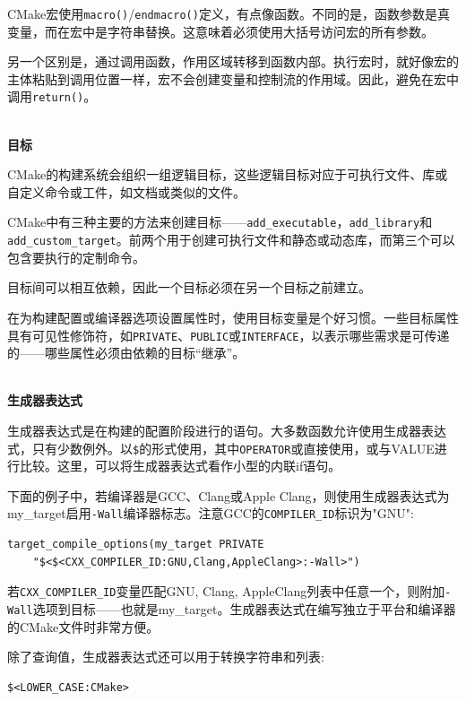 CMake宏使用\texttt{macro()}/\texttt{endmacro()}定义，有点像函数。不同的是，函数参数是真变量，而在宏中是字符串替换。这意味着必须使用大括号访问宏的所有参数。

另一个区别是，通过调用函数，作用区域转移到函数内部。执行宏时，就好像宏的主体粘贴到调用位置一样，宏不会创建变量和控制流的作用域。因此，避免在宏中调用\texttt{return()}。

\hspace*{\fill} \\ %
\noindent
\textbf{目标}

CMake的构建系统会组织一组逻辑目标，这些逻辑目标对应于可执行文件、库或自定义命令或工件，如文档或类似的文件。

CMake中有三种主要的方法来创建目标——\texttt{add\_executable}，\texttt{add\_library}和\texttt{add\_custom\_target}。前两个用于创建可执行文件和静态或动态库，而第三个可以包含要执行的定制命令。

目标间可以相互依赖，因此一个目标必须在另一个目标之前建立。

在为构建配置或编译器选项设置属性时，使用目标变量是个好习惯。一些目标属性具有可见性修饰符，如\texttt{PRIVATE}、\texttt{PUBLIC}或\texttt{INTERFACE}，以表示哪些需求是可传递的——哪些属性必须由依赖的目标“继承”。


\hspace*{\fill} \\ %
\noindent
\textbf{生成器表达式}

生成器表达式是在构建的配置阶段进行的语句。大多数函数允许使用生成器表达式，只有少数例外。以\texttt{\$<OPERATOR:VALUE>}的形式使用，其中\texttt{OPERATOR}或直接使用，或与VALUE进行比较。这里，可以将生成器表达式看作小型的内联if语句。

下面的例子中，若编译器是GCC、Clang或Apple Clang，则使用生成器表达式为my\_target启用\texttt{-Wall}编译器标志。注意GCC的\texttt{COMPILER\_ID}标识为"GNU":

\begin{lstlisting}[style=styleCMake]
target_compile_options(my_target PRIVATE
	"$<$<CXX_COMPILER_ID:GNU,Clang,AppleClang>:-Wall>")
\end{lstlisting}

若\texttt{CXX\_COMPILER\_ID}变量匹配GNU, Clang, AppleClang列表中任意一个，则附加\texttt{-Wall}选项到目标——也就是my\_target。生成器表达式在编写独立于平台和编译器的CMake文件时非常方便。

除了查询值，生成器表达式还可以用于转换字符串和列表:

\begin{lstlisting}[style=styleCMake]
$<LOWER_CASE:CMake>
\end{lstlisting}

